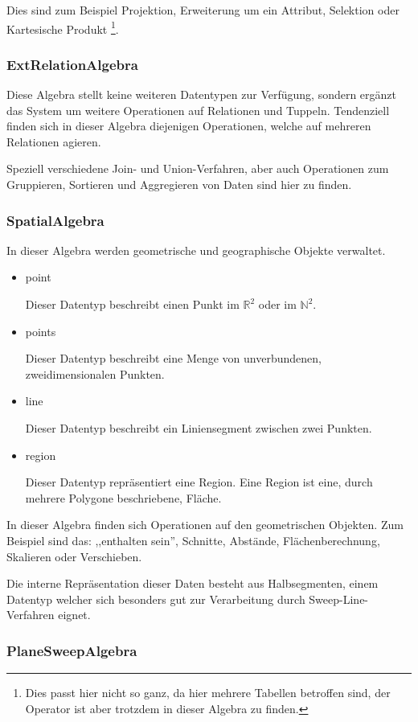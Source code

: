 Dies sind zum Beispiel Projektion, Erweiterung um ein Attribut, Selektion oder Kartesische Produkt \footnote{Dies passt hier nicht so ganz, da hier mehrere Tabellen betroffen sind, der Operator ist aber trotzdem in dieser Algebra zu finden.}.

\subsubsection{ExtRelationAlgebra}

Diese Algebra stellt keine weiteren Datentypen zur Verfügung, sondern ergänzt das System um weitere Operationen auf Relationen und Tuppeln. Tendenziell finden sich in dieser Algebra diejenigen Operationen, welche auf mehreren Relationen agieren.

Speziell verschiedene Join- und Union-Verfahren, aber auch Operationen zum Gruppieren, Sortieren und Aggregieren von Daten sind hier zu finden.

\subsubsection{SpatialAlgebra}
In dieser Algebra werden geometrische und geographische Objekte verwaltet.
\begin{itemize}
\item point

Dieser Datentyp beschreibt einen Punkt im $\mathbb{R}^2$ oder im $\mathbb{N}^2$.
\item points

Dieser Datentyp beschreibt eine Menge von unverbundenen, zweidimensionalen Punkten. 
\item line

Dieser Datentyp beschreibt ein Liniensegment zwischen zwei Punkten.
\item region

Dieser Datentyp repräsentiert eine Region. Eine Region ist eine, durch mehrere Polygone beschriebene, Fläche.
\end{itemize}

In dieser Algebra finden sich Operationen auf den geometrischen Objekten. Zum Beispiel sind das:
,,enthalten sein'', Schnitte, Abstände, Flächenberechnung, Skalieren oder Verschieben.
 
Die interne Repräsentation dieser Daten besteht aus Halbsegmenten, einem Datentyp welcher sich besonders gut zur Verarbeitung durch Sweep-Line-Verfahren eignet.

\subsubsection{PlaneSweepAlgebra}

